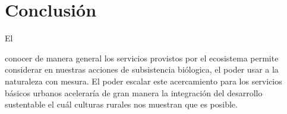\documentclass[stu, 12pt, letterpaper, donotrepeattitle, floatsintext, natbib]{apa7}
\begin{document}
\section*{Conclusión}
El \begin{justifying}
    conocer de manera general los servicios provistos por el ecosistema permite considerar en nuestras acciones de subsistencia biólogica, el poder usar
    a la naturaleza con mesura. El poder escalar este acercamiento para los servicios básicos urbanos aceleraría de gran manera la integración del desarrollo sustentable
    el cuál culturas rurales nos muestran que es posible.\par
\end{justifying}
\newpage
\setcounter{secnumdepth}{0} %
\renewcommand\refname{\textbf{Referencias}}

\end{document}
